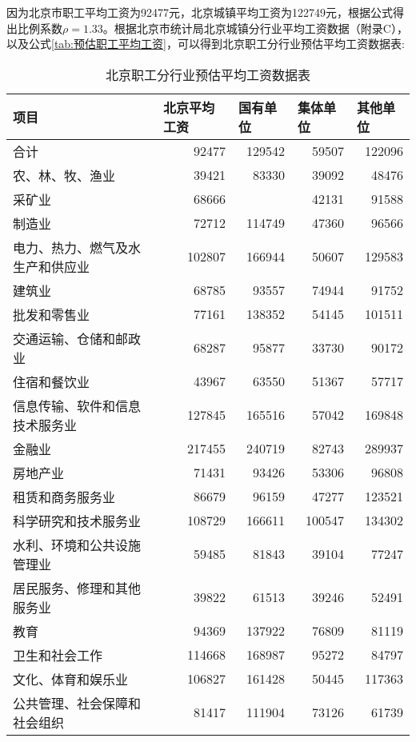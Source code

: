 \documentclass[withoutpreface,bwprint]{cumcmthesis} %
\newcommand{\upcite}[1]{\textsuperscript{\textsuperscript{\cite{#1}}}}
\begin{document}
因为北京市职工平均工资为92477元\upcite{bib:2}，北京城镇平均工资为122749元\upcite{bib:3}，根据公式得出比例系数$\rho=1.33$。根据北京市统计局北京城镇分行业平均工资数据（附录C），以及公式\ref{tab:预估职工平均工资}，可以得到北京职工分行业预估平均工资数据表:
\begin{table}[htbp]
  \centering
  \caption{北京职工分行业预估平均工资数据表}
    \begin{tabular}{|l|r|r|r|r|}
    \toprule
    项目 & \multicolumn{1}{l|}{北京平均工资} & \multicolumn{1}{l|}{国有单位} & \multicolumn{1}{l|}{集体单位} & \multicolumn{1}{l|}{其他单位} \\
    \midrule
    合计 & 92477  & 129542  & 59507  & 122096  \\
    \midrule
    农、林、牧、渔业 & 39421  & 83330  & 39092  & 48476  \\
    \midrule
    采矿业 & 68666  &   & 42131  & 91588  \\
    \midrule
    制造业 & 72712  & 114749  & 47360  & 96566  \\
    \midrule
    电力、热力、燃气及水生产和供应业 & 102807  & 166944  & 50607  & 129583  \\
    \midrule
    建筑业 & 68785  & 93557  & 74944  & 91752  \\
    \midrule
    批发和零售业 & 77161  & 138352  & 54145  & 101511  \\
    \midrule
    交通运输、仓储和邮政业 & 68287  & 95877  & 33730  & 90172  \\
    \midrule
    住宿和餐饮业 & 43967  & 63550  & 51367  & 57717  \\
    \midrule
    信息传输、软件和信息技术服务业 & 127845  & 165516  & 57042  & 169848  \\
    \midrule
    金融业 & 217455  & 240719  & 82743  & 289937  \\
    \midrule
    房地产业 & 71431  & 93426  & 53306  & 96808  \\
    \midrule
    租赁和商务服务业 & 86679  & 96159  & 47277  & 123521  \\
    \midrule
    科学研究和技术服务业 & 108729  & 166611  & 100547  & 134302  \\
    \midrule
    水利、环境和公共设施管理业 & 59485  & 81843  & 39104  & 77247  \\
    \midrule
    居民服务、修理和其他服务业 & 39822  & 61513  & 39246  & 52491  \\
    \midrule
    教育 & 94369  & 137922  & 76809  & 81119  \\
    \midrule
    卫生和社会工作 & 114668  & 168987  & 95272  & 84797  \\
    \midrule
    文化、体育和娱乐业 & 106827  & 161428  & 50445  & 117363  \\
    \midrule
    公共管理、社会保障和社会组织 & 81417  & 111904  & 73126  & 61739  \\
    \bottomrule
    \end{tabular}%
  \label{tab:北京职工分行业预估平均工资数据表}%
\end{table}%
\end{document}
